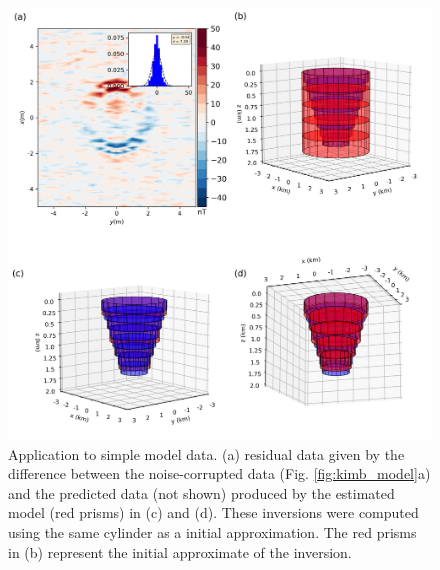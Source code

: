 \begin{figure}
	\centering
	\includegraphics[scale=.5]{figures/wedding_cake_results.png}
	\caption{Application to simple model data. (a) residual data given by the difference between the noise-corrupted data (Fig. \ref{fig:kimb_model}a) and the predicted data (not shown) produced by the estimated model (red prisms) in (c) and (d). These inversions were computed using the same cylinder as a initial approximation. The red prisms in (b) represent the initial approximate of the inversion.
	}
	\label{fig:kimb_results}
\end{figure}



